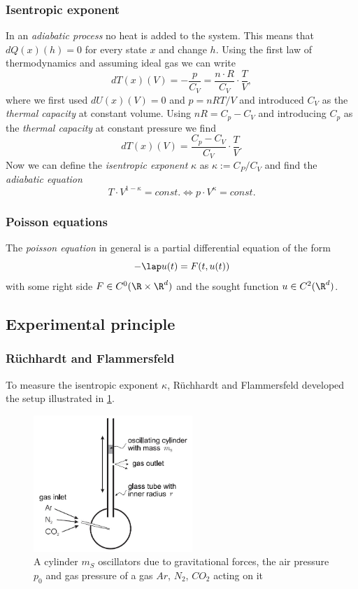 \documentclass{subfiles}
\begin{document}
        \subsubsection*{Isentropic exponent}
            In an \emph{adiabatic process} no heat is added to the system. This means that $dQ(x)(h) = 0$ for every state $x$ and change $h$. Using the first law of thermodynamics and assuming ideal gas we can write
            \[dT(x)(V) = -\frac{p}{C_V} = \frac{n\cdot R}{C_V}\cdot\frac{T}{V},\]
            where we first used $dU(x)(V) = 0$ and $p = nRT/V$ and introduced $C_V$ as the \emph{thermal capacity} at constant volume. Using $nR = C_p-C_V$ and introducing $C_p$ as the \emph{thermal capacity} at constant pressure we find
            \[dT(x)(V) = \frac{C_p-C_V}{C_V} \cdot\frac{T}{V}.\]
            Now we can define the \emph{isentropic exponent} $\kappa$ as $\kappa:=C_P/C_V$ and find the \emph{adiabatic equation}
            \[T\cdot V^{1-\kappa} = \textit{const}. \Longleftrightarrow p\cdot V^\kappa = \textit{const}.\]

        \subsubsection*{Poisson equations}
            The \emph{poisson equation} in general is a partial differential equation of the form
            \[-\lap u(t) = F(t,u(t))\]
            with some right side $F\in C^0(\R\times\R^d)$ and the sought function $u\in C^2(\R^d)$.
    
    \subsection{Experimental principle}
        \subsubsection*{Rüchhardt and Flammersfeld}
            To measure the isentropic exponent $\kappa$, Rüchhardt and Flammersfeld developed the setup illustrated in \ref{fig:RuchardtFlammersfeld}.

            \begin{figure}[H]
                \centering
                \includegraphics[width=6cm]{Bilddateien/Grundlagen/IsentropicRuchardtFlammersfeld.jpg}
                \caption{A cylinder $m_S$ oscillators due to gravitational forces, the air pressure $p_0$ and gas pressure of a gas $Ar$, $N_2$, $CO_2$ acting on it}
                \label{fig:RuchardtFlammersfeld}
            \end{figure}
\end{document}
